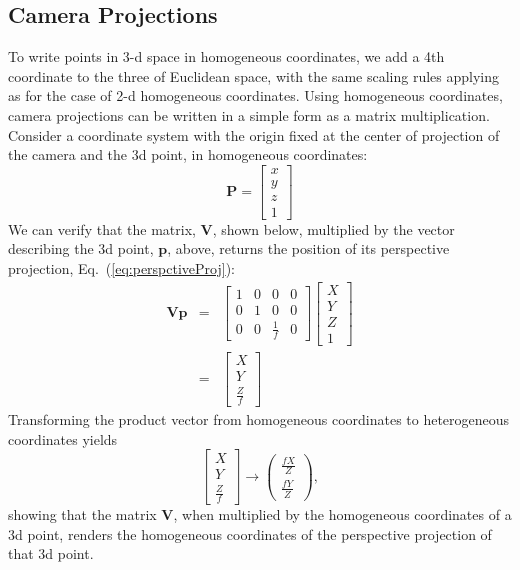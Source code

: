 \subsection{Camera Projections}
To write points in 3-d space in homogeneous coordinates, we add a 4th coordinate to the three of Euclidean space, with the same scaling rules applying as for the case of 2-d homogeneous coordinates.
Using homogeneous coordinates, camera projections can be written in a simple form as a matrix multiplication.  Consider a coordinate system with the origin fixed at the center of projection of the camera and the 3d point, in homogeneous coordinates:
\begin{equation}
        \mathbf{P} = 
            \left [
    \begin{array}{c}
    x \\
    y \\
        z \\
    1
    \end{array}
    \right ]
\end{equation}
We can verify that the matrix, $\mathbf{V}$, shown below, multiplied by the vector describing the 3d point, $\mathbf{p}$, above, returns the position of its perspective projection, Eq.~(\ref{eq:perspctiveProj}):
\begin{eqnarray}
        \mathbf{V} \mathbf{p} & = &
         \left [
    \begin{array}{cccc}
    1 & 0 & 0 & 0 \\
    0 & 1 & 0 & 0 \\
    0 & 0 & \frac{1}{f} & 0
    \end{array}
    \right ]
            \left [
    \begin{array}{c}
    X \\
    Y \\
        Z \\
    1
    \end{array}
    \right ] \\
    & = & 
     \left [
    \begin{array}{c}
    X \\
    Y \\
        \frac{Z}{f}
    \end{array}
    \right ]
\end{eqnarray}
Transforming the product vector from homogeneous coordinates to heterogeneous coordinates yields
\begin{equation}
         \left [
    \begin{array}{c}
    X \\
    Y \\
        \frac{Z}{f}
    \end{array}
    \right ]
    \rightarrow
             \left (
    \begin{array}{c}
    \frac{f X}{Z} \\
    \frac{f Y}{Z}
    \end{array}
    \right ),
\end{equation}
showing that the matrix $\mathbf{V}$, when multiplied by the homogeneous coordinates of a 3d point, renders the homogeneous coordinates of the perspective projection of that 3d point.

